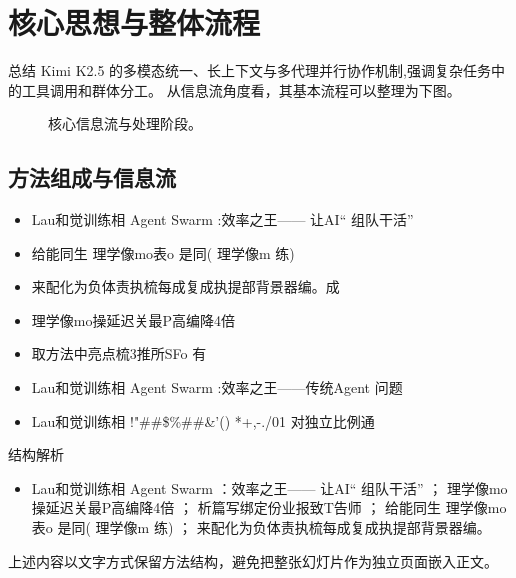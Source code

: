 \documentclass[UTF8,11pt,a4paper]{ctexart}
\begin{document}
\section{核心思想与整体流程}
总结 Kimi K2.5 的多模态统一、长上下文与多代理并行协作机制,强调复杂任务中的工具调用和群体分工。 从信息流角度看，其基本流程可以整理为下图。

\begin{figure}[H]
\centering
{}
\caption{核心信息流与处理阶段。}
\end{figure}

\subsection{方法组成与信息流}
\begin{itemize}
\item Lau和觉训练相 Agent Swarm :效率之王—— 让AI“ 组队干活”
\item 给能同生 理学像mo表o 是同( 理学像m 练)
\item 来配化为负体责执梳每成复成执提部背景器编。成
\item 理学像mo操延迟关最P高编降4倍
\item 取方法中亮点梳3推所SFo 有
\item Lau和觉训练相 Agent Swarm :效率之王——传统Agent 问题
\item Lau和觉训练相 !"\#\#\$\%\#\#\&'() *+,-./01 对独立比例通
\end{itemize}

\begin{keybox}{结构解析}
\begin{itemize}
\item Lau和觉训练相 Agent Swarm ：效率之王—— 让AI“ 组队干活” ； 理学像mo操延迟关最P高编降4倍 ； 析篇写绑定份业报致T告师 ； 给能同生 理学像mo表o 是同( 理学像m 练) ； 来配化为负体责执梳每成复成执提部背景器编。
\end{itemize}
\end{keybox}

上述内容以文字方式保留方法结构，避免把整张幻灯片作为独立页面嵌入正文。
\end{document}
